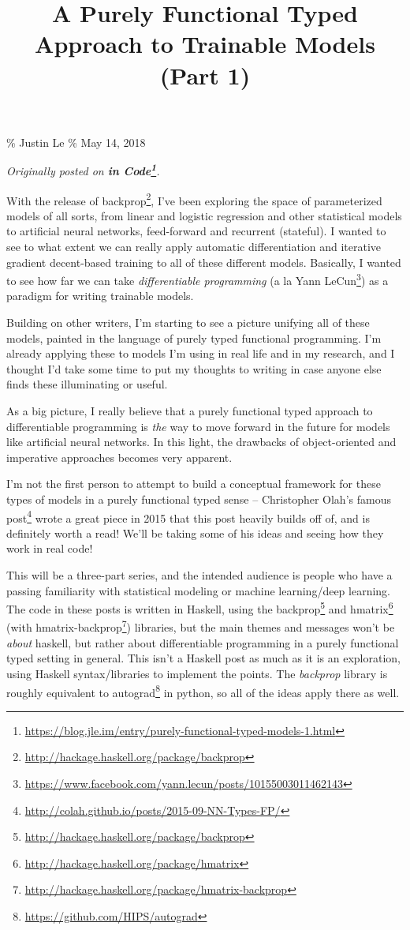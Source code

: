 \documentclass[]{article}
\title{A Purely Functional Typed Approach to Trainable Models (Part 1)}
\renewcommand{\href}[2]{#2\footnote{\url{#1}}}
\begin{document}
\maketitle

\% Justin Le \% May 14, 2018

\emph{Originally posted on
\textbf{\href{https://blog.jle.im/entry/purely-functional-typed-models-1.html}{in
Code}}.}

With the release of
\href{http://hackage.haskell.org/package/backprop}{backprop}, I've been
exploring the space of parameterized models of all sorts, from linear and
logistic regression and other statistical models to artificial neural networks,
feed-forward and recurrent (stateful). I wanted to see to what extent we can
really apply automatic differentiation and iterative gradient decent-based
training to all of these different models. Basically, I wanted to see how far we
can take \emph{differentiable programming} (a la
\href{https://www.facebook.com/yann.lecun/posts/10155003011462143}{Yann LeCun})
as a paradigm for writing trainable models.

Building on other writers, I'm starting to see a picture unifying all of these
models, painted in the language of purely typed functional programming. I'm
already applying these to models I'm using in real life and in my research, and
I thought I'd take some time to put my thoughts to writing in case anyone else
finds these illuminating or useful.

As a big picture, I really believe that a purely functional typed approach to
differentiable programming is \emph{the} way to move forward in the future for
models like artificial neural networks. In this light, the drawbacks of
object-oriented and imperative approaches becomes very apparent.

I'm not the first person to attempt to build a conceptual framework for these
types of models in a purely functional typed sense --
\href{http://colah.github.io/posts/2015-09-NN-Types-FP/}{Christopher Olah's
famous post} wrote a great piece in 2015 that this post heavily builds off of,
and is definitely worth a read! We'll be taking some of his ideas and seeing how
they work in real code!

This will be a three-part series, and the intended audience is people who have a
passing familiarity with statistical modeling or machine learning/deep learning.
The code in these posts is written in Haskell, using the
\href{http://hackage.haskell.org/package/backprop}{backprop} and
\href{http://hackage.haskell.org/package/hmatrix}{hmatrix} (with
\href{http://hackage.haskell.org/package/hmatrix-backprop}{hmatrix-backprop})
libraries, but the main themes and messages won't be \emph{about} haskell, but
rather about differentiable programming in a purely functional typed setting in
general. This isn't a Haskell post as much as it is an exploration, using
Haskell syntax/libraries to implement the points. The \emph{backprop} library is
roughly equivalent to \href{https://github.com/HIPS/autograd}{autograd} in
python, so all of the ideas apply there as well.
\end{document}
